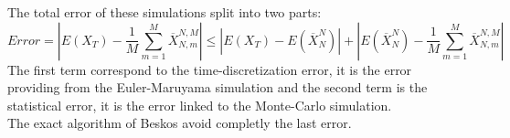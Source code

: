 The total error of these simulations split into two parts:
\begin{equation}
  \label{error-euler}
  Error=\left|E(X_T)-\frac{1}{M}\sum_{m=1}^{M}\overline{X}_{N,m}^{N,M}\right|\leq\left|E(X_T)-E\left(\overline{X}_N^N\right)\right|+\left|E\left(\overline{X}_N^N\right)-\frac{1}{M}\sum_{m=1}^{M}\overline{X}_{N,m}^{N,M}\right|

\end{equation}
The first term correspond to the time-discretization error, it is the error providing from the Euler-Maruyama simulation and the second term is the statistical error, it is the error linked to the Monte-Carlo simulation. \\ The exact algorithm of Beskos avoid completly the last error.
